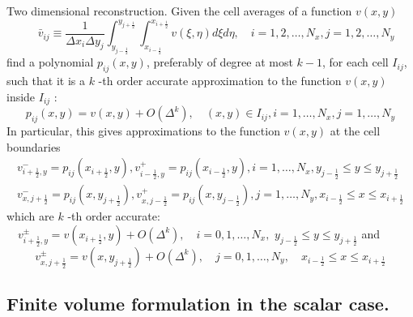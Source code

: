 \documentclass[12pt]{article}
\begin{document}
Two dimensional reconstruction. Given the cell averages of a function $v(x, y)$
\begin{equation}
	\quad \bar{v}_{i j} \equiv \frac{1}{\Delta x_{i} \Delta y_{j}} \int_{y_{j-\frac{1}{2}}}^{y_{j+\frac{1}{2}}} \int_{x_{i-\frac{1}{2}}}^{x_{i+\frac{1}{2}}} v(\xi, \eta) d \xi d \eta, \quad i=1,2, \ldots, N_{x}, j=1,2, \ldots, N_{y}
\end{equation}
find a polynomial $p_{i j}(x, y)$, preferably of degree at most $k-1$, for each cell $I_{i j}$, such that it is a $k$ -th order accurate approximation to the function $v(x, y)$ inside $I_{i j}$ :
\begin{equation}
	p_{i j}(x, y)=v(x, y)+O\left(\Delta^{k}\right), \quad(x, y) \in I_{i j}, i=1, \ldots, N_{x}, j=1, \ldots, N_{y}
\end{equation}
In particular, this gives approximations to the function $v(x, y)$ at the cell boundaries
\begin{equation}
	\begin{array}{l}
		v_{i+\frac{1}{2}, y}^{-}=p_{i j}\left(x_{i+\frac{1}{2}}, y\right), v_{i-\frac{1}{2}, y}^{+}=p_{i j}\left(x_{i-\frac{1}{2}}, y\right), i=1, \ldots, N_{x}, y_{j-\frac{1}{2}} \leq y \leq y_{j+\frac{1}{2}} \\
		v_{x, j+\frac{1}{2}}^{-}=p_{i j}\left(x, y_{j+\frac{1}{2}}\right), v_{x, j-\frac{1}{2}}^{+}=p_{i j}\left(x, y_{j-\frac{1}{2}}\right), j=1, \ldots, N_{y}, x_{i-\frac{1}{2}} \leq x \leq x_{i+\frac{1}{2}}
	\end{array}
\end{equation}
which are $k$ -th order accurate:
$\quad v_{i+\frac{1}{2}, y}^{\pm}=v\left(x_{i+\frac{1}{2}}, y\right)+O\left(\Delta^{k}\right), \quad i=0,1, \ldots, N_{x}, $ $ y_{j-\frac{1}{2}} \leq y \leq y_{j+\frac{1}{2}}$
and
\begin{equation}
	v_{x, j+\frac{1}{2}}^{\pm}=v\left(x, y_{j+\frac{1}{2}}\right)+O\left(\Delta^{k}\right), \quad j=0,1, \ldots, N_{y}, \quad x_{i-\frac{1}{2}} \leq x \leq x_{i+\frac{1}{2}}
\end{equation}


\subsection{Finite volume formulation in the scalar case.}
\end{document}

